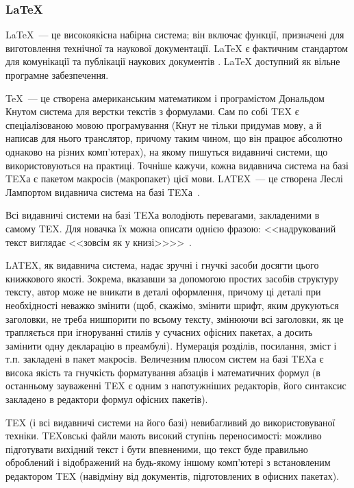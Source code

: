 \subsubsection{LaTeX} \label{subsub:latex}

\LaTeX~--- це високоякісна набірна система; він включає функції, призначені для виготовлення технічної та наукової документації. LaTeX є фактичним стандартом для комунікації та публікації наукових документів \cite{lamport1994latex}. LaTeX доступний як вільне програмне забезпечення.

\TeX~--- це створена американським математиком і програмістом Дональдом Кнутом система для верстки текстів з формулами. Сам по собі TEX є спеціалізованою мовою програмування (Кнут не тільки придумав мову, а й написав для нього транслятор, причому таким чином, що він працює абсолютно однаково на різних комп'ютерах), на якому пишуться видавничі системи, що використовуються на практиці. Точніше кажучи, кожна видавнича система на базі TEXа є пакетом макросів (макропакет) цієї мови. LATEX~--- це створена Леслі Лампортом видавнича система на базі TEXа~\cite{львовский2003latex}.

Всі видавничі системи на базі TEXа володіють перевагами, закладеними в самому TEX. Для новачка їх можна описати однією фразою: <<надрукований текст виглядає <<зовсім як у книзі>>>>~\cite{львовский2003latex}.

LATEX, як видавнича система, надає зручні і гнучкі засоби досягти цього книжкового якості. Зокрема, вказавши за допомогою простих засобів структуру тексту, автор може не вникати в деталі оформлення, причому ці деталі при необхідності неважко змінити (щоб, скажімо, змінити шрифт, яким друкуються заголовки, не треба нишпорити по всьому тексту, змінюючи всі заголовки, як це трапляється при ігноруванні стилів у сучасних офісних пакетах, а досить замінити одну декларацію в преамбулі). Нумерація розділів, посилання, зміст і т.п. закладені в пакет макросів. Величезним плюсом систем на базі TEXа є висока якість та гнучкість форматування абзаців і математичних формул (в останньому зауваженні TEX є одним з напотужніших редакторів, його синтаксис закладено в редактори формул офісних пакетів).

TEX (і всі видавничі системи на його базі) невибагливий до використовуваної техніки. TEXовські файли мають високий ступінь переносимості: можливо підготувати вихідний текст і бути впевненими, що текст буде правильно оброблений і відображений на будь-якому іншому комп'ютері з встановленим редактором TEX (навідміну від документів, підготовлених в офисних пакетах). 


